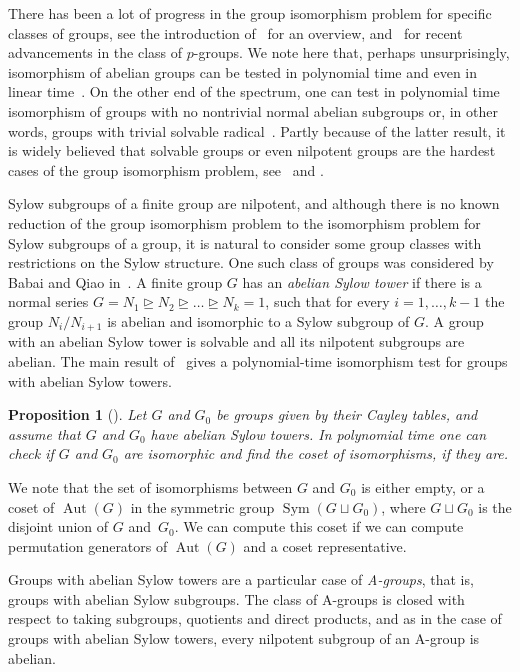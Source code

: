 \documentclass{article}
\newtheorem{proposition}[theorem]{Proposition}
\DeclareMathOperator{\Sym}{Sym}
\DeclareMathOperator{\Aut}{Aut}
\begin{document}
There has been a lot of progress in the group isomorphism problem for specific classes of groups, see the introduction of~\cite{grochow}
for an overview, and~\cite{brooksbank, ivanyos, grochowPgrs} for recent advancements in the class of \( p \)-groups.
We note here that, perhaps unsurprisingly, isomorphism of abelian groups can be tested in polynomial time and even in linear time~\cite{kavitha}.
On the other end of the spectrum, one can test in polynomial time isomorphism of groups with no nontrivial normal abelian subgroups or,
in other words, groups with trivial solvable radical~\cite{trivrad}. Partly because of the latter result, it is widely believed
that solvable groups or even nilpotent groups are the hardest cases of the group isomorphism problem, see~\cite[Subsection~1.1]{absyl} and \cite[Subsection~1.2]{grochow}.

Sylow subgroups of a finite group are nilpotent, and although there is no known reduction of the group isomorphism problem to the
isomorphism problem for Sylow subgroups of a group, it is natural to consider some group classes with restrictions on the Sylow structure.
One such class of groups was considered by Babai and Qiao in~\cite{absyl}. A finite group \( G \) has an \emph{abelian Sylow tower}
if there is a normal series \( G = N_1 \unrhd N_2 \unrhd \dots \unrhd N_k = 1 \), such that for every \( i = 1, \dots, k-1 \) the group
\( N_i/N_{i+1} \) is abelian and isomorphic to a Sylow subgroup of \( G \). A group with an abelian Sylow tower is solvable
and all its nilpotent subgroups are abelian.
The main result of~\cite{absyl} gives a polynomial-time isomorphism test for groups with abelian Sylow towers.

\begin{proposition}[{\cite[Theorem~1.1]{absyl}}]\label{atower}
	Let \( G \) and \( G_0 \) be groups given by their Cayley tables, and assume that \( G \) and \( G_0 \) have abelian Sylow towers.
	In polynomial time one can check if \( G \) and \( G_0 \) are isomorphic and find the coset of isomorphisms, if they are.
\end{proposition}

We note that the set of isomorphisms between \( G \) and \( G_0 \) is either empty, or a coset of \( \Aut(G) \) in the symmetric group \( \Sym(G \sqcup G_0) \),
where \( G \sqcup G_0 \) is the disjoint union of \( G \) and~\( G_0 \). We can compute this coset if we can compute permutation generators of \( \Aut(G) \)
and a coset representative.

Groups with abelian Sylow towers are a particular case of \emph{A-groups}, that is, groups with abelian Sylow subgroups.
The class of A-groups is closed with respect to taking subgroups, quotients and direct products,
and as in the case of groups with abelian Sylow towers, every nilpotent subgroup of an A-group is abelian.
\end{document}
